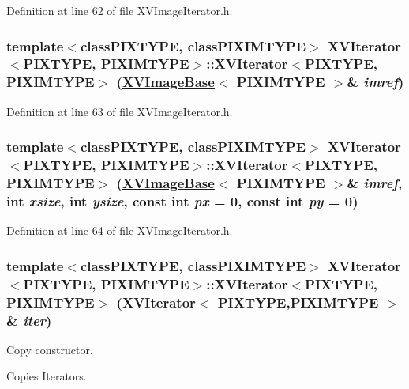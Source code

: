 Definition at line 62 of file XVImage\-Iterator.h.\label{XVIterator_a1}
\hypertarget{class_XVIterator_a1}{
\subsubsection[XVIterator]{\setlength{\rightskip}{0pt plus 5cm}template$<$classPIXTYPE, classPIXIMTYPE$>$ XVIterator$<$PIXTYPE, PIXIMTYPE$>$::XVIterator$<$PIXTYPE, PIXIMTYPE$>$ (\hyperlink{class_XVImageBase}{XVImage\-Base}$<$ PIXIMTYPE $>$\& {\em imref})}}




Definition at line 63 of file XVImage\-Iterator.h.\label{XVIterator_a2}
\hypertarget{class_XVIterator_a2}{
\subsubsection[XVIterator]{\setlength{\rightskip}{0pt plus 5cm}template$<$classPIXTYPE, classPIXIMTYPE$>$ XVIterator$<$PIXTYPE, PIXIMTYPE$>$::XVIterator$<$PIXTYPE, PIXIMTYPE$>$ (\hyperlink{class_XVImageBase}{XVImage\-Base}$<$ PIXIMTYPE $>$\& {\em imref}, int {\em xsize}, int {\em ysize}, const int {\em px} = 0, const int {\em py} = 0)}}




Definition at line 64 of file XVImage\-Iterator.h.\label{XVIterator_a4}
\hypertarget{class_XVIterator_a4}{
\subsubsection[XVIterator]{\setlength{\rightskip}{0pt plus 5cm}template$<$classPIXTYPE, classPIXIMTYPE$>$ XVIterator$<$PIXTYPE, PIXIMTYPE$>$::XVIterator$<$PIXTYPE, PIXIMTYPE$>$ (XVIterator$<$ PIXTYPE,PIXIMTYPE $>$\& {\em iter})}}


Copy constructor.

Copies Iterators. 

